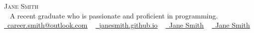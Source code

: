 \begin{center}
	{\Huge \scshape Jane Smith} \\ \vspace{1pt} ~
	A recent graduate who is passionate and proficient in programming.\\ \vspace{1pt}
	\small
	\href{mailto:career.smith@outlook.com}{\raisebox{-0.2\height}\faEnvelope\  \underline{career.smith@outlook.com}} ~
	\href{https://github.com/chongfengling/resume_template}{\raisebox{-0.2\height}\faUser\  \underline{janesmith.github.io}} ~
	\href{https://github.com/chongfengling/resume_template}{\raisebox{-0.2\height}\faLinkedin\ \underline{Jane Smith}}  ~
	\href{https://github.com/chongfengling/resume_template}{\raisebox{-0.2\height}\faGithub\ \underline{Jane Smith}} ~
	\vspace{-8pt}
\end{center}